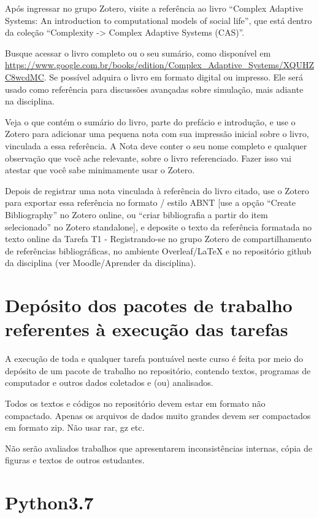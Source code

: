 Após ingressar no grupo Zotero, visite a referência ao livro ``Complex Adaptive Systems: An introduction to computational models of social life'', que está dentro da coleção ``Complexity -> Complex Adaptive Systems (CAS)''.

Busque acessar o livro completo ou o seu sumário, como disponível em \url{https://www.google.com.br/books/edition/Complex_Adaptive_Systems/XQUHZC8wcdMC}. Se possível adquira o livro em formato digital ou impresso. Ele será usado como referência para discussões avançadas sobre simulação, mais adiante na disciplina.

Veja o que contém o sumário do livro, parte do prefácio e introdução, e use o Zotero para adicionar uma pequena nota com sua impressão inicial sobre o livro, vinculada a essa referência. A Nota deve conter o seu nome completo e qualquer observação que você ache relevante, sobre o livro referenciado. Fazer isso vai atestar que você sabe minimamente usar o Zotero.

Depois de registrar uma nota vinculada à referência do livro citado, use o Zotero para exportar essa referência no formato / estilo ABNT [use a opção ``Create Bibliography'' no Zotero online, ou ``criar bibliografia a partir do item selecionado''  no Zotero standalone], e deposite o texto da referência formatada no texto online da Tarefa T1 - Registrando-se no grupo Zotero de compartilhamento de referências bibliográficas, no ambiente Overleaf/LaTeX e no repositório github da disciplina (ver Moodle/Aprender da disciplina).

\section{Depósito dos pacotes de trabalho referentes à execução das tarefas}

A execução de toda e qualquer tarefa pontuável neste curso é feita por meio do depósito de um pacote de trabalho no repositório, contendo textos, programas de computador e outros dados coletados e (ou) analisados. 

Todos os textos e códigos no repositório devem estar em formato não compactado. Apenas os arquivos de dados muito grandes devem ser compactados em formato zip. Não usar rar, gz etc. 

Não serão avaliados trabalhos que apresentarem inconsistências internas, cópia de figuras e textos de outros estudantes.

\section{Python3.7}

